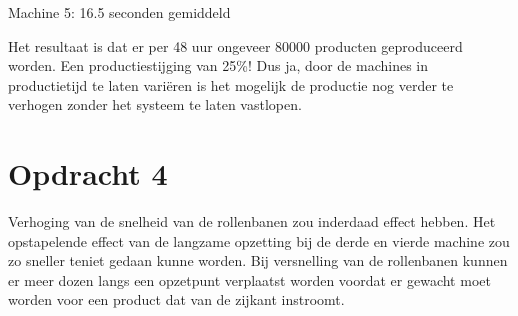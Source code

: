 Machine 5: 16.5 seconden gemiddeld 

Het resultaat is dat er per 48 uur ongeveer 80000 producten geproduceerd
worden. Een productiestijging van 25\%! Dus ja, door de machines in
productietijd te laten variëren is het mogelijk de productie nog verder
te verhogen zonder het systeem te laten vastlopen.
\section{Opdracht 4}
Verhoging van de snelheid van de rollenbanen zou inderdaad effect
hebben. Het opstapelende effect van de langzame opzetting bij de derde
en vierde machine zou zo sneller teniet gedaan kunne worden. Bij
versnelling van  de rollenbanen kunnen er meer dozen langs een opzetpunt
verplaatst worden voordat er gewacht moet worden voor een product dat
van de zijkant instroomt.